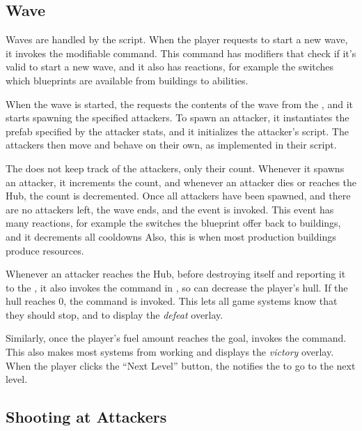 \subsection{Wave}

Waves are handled by the  script.
When the player requests to start a new wave, it invokes the  modifiable command.
This command has modifiers that check if it's valid to start a new wave, and it also has reactions, for example the  switches which blueprints are available from buildings to abilities.

When the wave is started, the  requests the contents of the wave from the , and it starts spawning the specified attackers.
To spawn an attacker, it instantiates the prefab specified by the attacker stats, and it initializes the attacker's  script.
The attackers then move and behave on their own, as implemented in their  script.

The  does not keep track of the attackers, only their count.
Whenever it spawns an attacker, it increments the count, and whenever an attacker dies or reaches the Hub, the count is decremented.
Once all attackers have been spawned, and there are no attackers left, the wave ends, and the  event is invoked.
This event has many reactions, for example the  switches the blueprint offer back to buildings, and it decrements all cooldowns
Also, this is when most production buildings produce resources.

Whenever an attacker reaches the Hub, before destroying itself and reporting it to the , it also invokes the command  in , so  can decrease the player's hull.
If the hull reaches 0, the command  is invoked.
This lets all game systems know that they should stop, and to display the \emph{defeat} overlay.

Similarly, once the player's fuel amount reaches the goal,  invokes the  command.
This also makes most systems from working and displays the \emph{victory} overlay.
When the player clicks the \enquote{Next Level} button, the  notifies the  to go to the next level.

\subsection{Shooting at Attackers}

